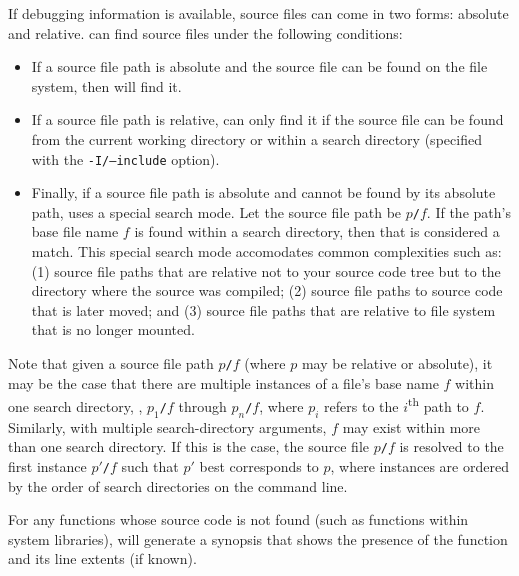 \documentclass[11pt,twoside,letterpaper]{report}
\begin{document}
If debugging information is available, source files can come in two forms: absolute and relative.
\hpcprofAll{} can find source files under the following conditions:
\begin{itemize}
\item If a source file path is absolute and the source file can be found on the file system, then \hpcprofAll{} will find it.
\item If a source file path is relative, \hpcprofAll{} can only find it if the source file can be found from the current working directory or within a search directory (specified with the \texttt{-I/--include} option).
\item Finally, if a source file path is absolute and cannot be found by its absolute path, \hpcprofAll{} uses a special search mode.
Let the source file path be \texttt{$p$/$f$}.
If the path's base file name $f$ is found within a search directory, then that is considered a match.
This special search mode accomodates common complexities such as:
(1) source file paths that are relative not to your source code tree but to the directory where the source was compiled;
(2) source file paths to source code that is later moved; and
(3) source file paths that are relative to file system that is no longer mounted.
\end{itemize}
Note that given a source file path \texttt{$p$/$f$} (where $p$ may be relative or absolute), it may be the case that there are multiple instances of a file's base name $f$ within one search directory, \eg{}, \texttt{$p_1$/$f$} through \texttt{$p_n$/$f$}, where $p_i$ refers to the $i$\textsuperscript{th} path to $f$.
Similarly, with multiple search-directory arguments, $f$ may exist within more than one search directory.
If this is the case, the source file \texttt{$p$/$f$} is resolved to the first instance \texttt{$p'$/$f$} such that $p'$ best corresponds to $p$, where instances are ordered by the order of search directories on the command line.

For any functions whose source code is not found (such as functions within system libraries), \hpcviewer{} will generate a synopsis that shows the presence of the function and its line extents (if known).





\end{document}
